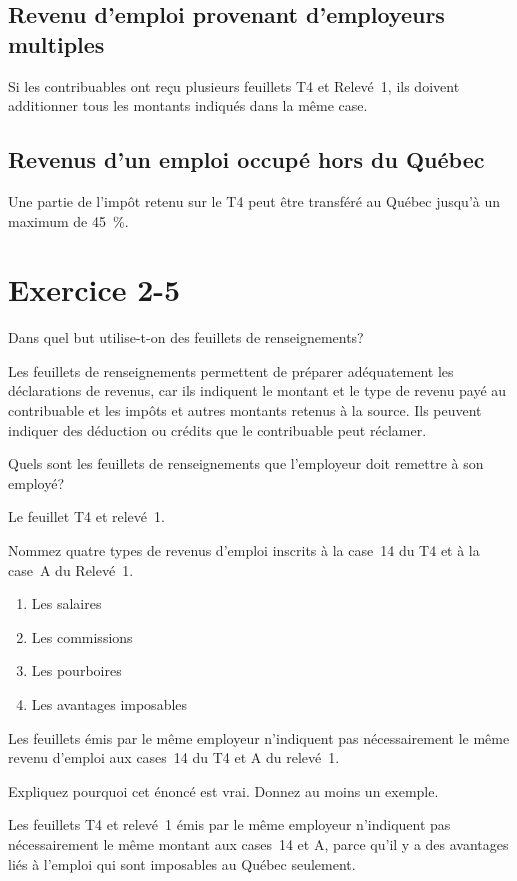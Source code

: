\subsection{Revenu d'emploi provenant d'employeurs multiples}
Si les contribuables ont reçu plusieurs feuillets T4 et Relevé~1, ils doivent additionner tous les montants indiqués dans la même case.

\subsection{Revenus d'un emploi occupé hors du Québec}
Une partie de l'impôt retenu sur le T4 peut être transféré au Québec jusqu'à un maximum de 45~\%.



\section{Exercice 2-5}
\setcounter{question}{0}
\begin{question}
	Dans quel but utilise-t-on des feuillets de renseignements?
\end{question}
Les feuillets de renseignements permettent de préparer adéquatement les déclarations de revenus, car ils indiquent le montant et le type de revenu payé au contribuable et les impôts et autres montants retenus à la source.
Ils peuvent indiquer des déduction ou crédits que le contribuable peut réclamer.

\begin{question}
	Quels sont les feuillets de renseignements que l'employeur doit remettre à son employé?
\end{question}
Le feuillet T4 et relevé~1.

\begin{question}
	Nommez quatre types de revenus d'emploi inscrits à la case~14 du T4 et à la case~A du Relevé~1.
\end{question}
\begin{enumerate}
	\item Les salaires 
	\item Les commissions 
	\item Les pourboires  
	\item Les avantages imposables
\end{enumerate}

\begin{question}
	Les feuillets émis par le même employeur n'indiquent pas nécessairement le même revenu d'emploi aux cases~14 du T4 et A du relevé~1.
	
	Expliquez pourquoi cet énoncé est vrai. Donnez au moins un exemple.
\end{question}
Les feuillets T4 et relevé~1 émis par le même employeur n'indiquent pas nécessairement le même montant aux cases~14 et A, parce qu'il y a des avantages liés à l'emploi qui sont imposables au Québec seulement.

